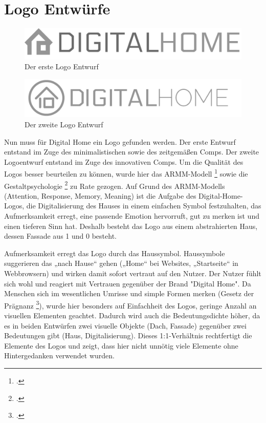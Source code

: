 \section{Logo Entwürfe}
\begin{figure} [tp]
\includegraphics[width=\textwidth]{./img/logo1.png}
\caption{Der erste Logo Entwurf}
\label{logo1}
\end{figure}
\begin{figure} [tp]
\includegraphics[width=\textwidth]{./img/logo2.png}
\caption{Der zweite Logo Entwurf}
\label{logo2}
\end{figure}
Nun muss für Digital Home ein Logo gefunden werden. Der erste Entwurf entstand im Zuge des minimalistischen sowie des zeitgemäßen Comps. Der zweite Logoentwurf entstand im Zuge des innovativen Comps. Um die Qualität des Logos besser beurteilen zu können, wurde hier das ARMM-Modell \footcite[vgl.][]{ARMM:model} sowie die Gestaltpsychologie \footcite[vgl.][]{gestalt} zu Rate gezogen. Auf Grund des ARMM-Modells (Attention, Response, Memory, Meaning) ist die Aufgabe des Digital-Home-Logos, die Digitalisierung des Hauses in einem einfachen Symbol festzuhalten, das Aufmerksamkeit erregt, eine passende Emotion hervorruft, gut zu merken ist und einen tieferen Sinn hat. Deshalb besteht das Logo aus einem abstrahierten Haus, dessen Fassade aus 1 und 0 besteht.

Aufmerksamkeit erregt das Logo durch das Haussymbol. Haussymbole suggerieren das „nach Hause“ gehen („Home“ bei Websites, „Startseite“ in Webbrowsern) und wirken damit sofort vertraut auf den Nutzer. Der Nutzer fühlt sich wohl und reagiert mit Vertrauen gegenüber der Brand "Digital Home". Da Menschen sich im wesentlichen Umrisse und simple Formen merken (Gesetz der Prägnanz \footcite[vgl.][]{gestalt}), wurde hier besonders auf Einfachheit des Logos, geringe Anzahl an visuellen Elementen geachtet. Dadurch wird auch die Bedeutungsdichte höher, da es in beiden Entwürfen zwei visuelle Objekte (Dach, Fassade) gegenüber zwei Bedeutungen gibt (Haus, Digitalisierung). Dieses 1:1-Verhältnis rechtfertigt die Elemente des Logos und zeigt, dass hier nicht unnötig viele Elemente ohne Hintergedanken verwendet wurden.

